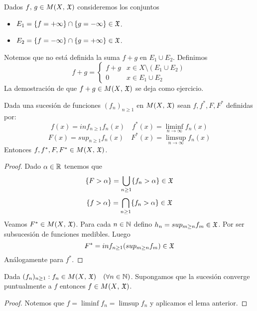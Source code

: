 \clearpage

\begin{note}
    Dados $f\text{, } g \in M(X\text{, } \mathfrak{X})$ consideremos los conjuntos \begin{itemize}
        \item $E_1 = \{ f = + \infty \} \cap \{ g = - \infty \} \in \mathfrak{X}$.
        \item $E_2 = \{ f = - \infty \} \cap \{ g = + \infty \} \in \mathfrak{X}$.
    \end{itemize}
    Notemos que no está definida la suma $f + g$ en $E_1 \cup E_2$.
    Definimos \begin{equation*}
        f+g = \begin{cases}
            f+g & x \in X \setminus (E_1 \cup E_2) \\
            0   & x \in E_1 \cup E_2
        \end{cases}
    \end{equation*}
    La demostración de que $f+g \in M(X\text{, } \mathfrak{X})$ se deja como ejercicio.
\end{note}

\begin{lemma}
    Dada una sucesión de funciones $(f_n)_{n \geq 1}$ en $M(X\text{, } \mathfrak{X})$ sean $f, f^*, F, F^*$ definidas por:
    \begin{equation*}
        f(x) = inf_{n \geq 1} f_n(x) \quad f^*(x) = \liminf_{n \to \infty} f_n(x)
    \end{equation*}
    \begin{equation*}
        F(x) = sup_{n \geq 1} f_n(x) \quad F^*(x) = \limsup_{n \to \infty} f_n(x)
    \end{equation*}
    Entonces $f, f^*, F, F^* \in M(X\text{, } \mathfrak{X})$.
    \begin{proof}
        Dado $\alpha \in \mathbb{R}$ tenemos que \begin{equation*}
            \{ F > \alpha \} = \bigcup_{n \geq 1} \{ f_n > \alpha \} \in \mathfrak{X}
        \end{equation*}
        \begin{equation*}
            \{ f > \alpha \} = \bigcap_{n \geq 1} \{ f_n > \alpha \} \in \mathfrak{X}
        \end{equation*}
        Veamos $F^* \in M(X\text{, } \mathfrak{X})$. Para cada $n \in \mathbb{N}$ defino $h_n = sup_{m \geq n} f_m \in \mathfrak{X}$. Por ser subsucesión de funciones medibles.
        Luego \begin{equation*}
            F^* = inf_{n \geq 1} (sup_{m \geq n} f_m) \in \mathfrak{X}
        \end{equation*}
        Análogamente para $f^*$.
    \end{proof}
\end{lemma}

\begin{corollary}
    Dada $(f_n)_{n \geq 1} : f_n \in M(X\text{, } \mathfrak{X}) \quad (\forall n \in \mathbb{N})$. Supongamos que la sucesión converge puntualmente a $f$ entonces $f \in M(X\text{, } \mathfrak{X})$.
    \begin{proof}
        Notemos que $f = \liminf f_n = \limsup f_n$ y aplicamos el lema anterior.
    \end{proof}
\end{corollary}